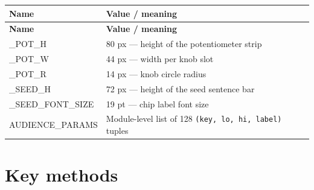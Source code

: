 \documentclass[11pt,a4paper]{report}
\begin{document}
\begin{longtable}{>{\ttfamily}p{} p{}}
\toprule
\textbf{Name} & \textbf{Value / meaning} \\
\midrule
\endfirsthead
\toprule
\textbf{Name} & \textbf{Value / meaning} \\
\midrule
\endhead
\_POT\_H & 80 px — height of the potentiometer strip \\
\_POT\_W & 44 px — width per knob slot \\
\_POT\_R & 14 px — knob circle radius \\
\_SEED\_H & 72 px — height of the seed sentence bar \\
\_SEED\_FONT\_SIZE & 19 pt — chip label font size \\
AUDIENCE\_PARAMS & Module-level list of 128 \texttt{(key, lo, hi, label)} tuples \\
\bottomrule
\end{longtable}

\section{Key methods}
\end{document}
